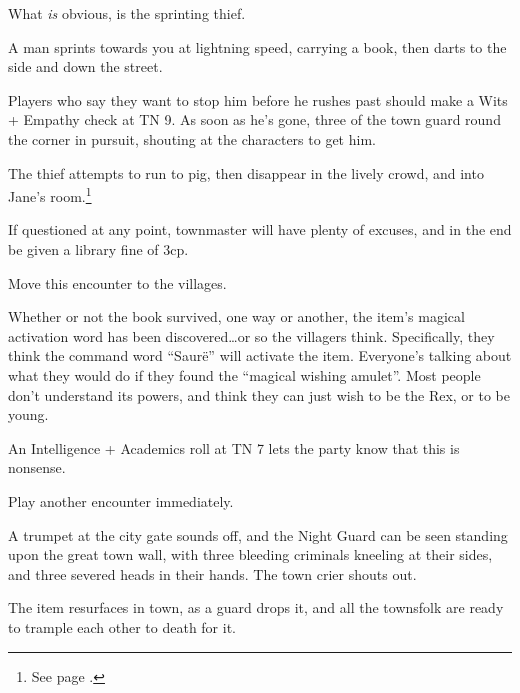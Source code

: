 \begin{multicols}{2}
What \emph{is} obvious, is the sprinting thief.

\begin{boxtext}

	A man sprints towards you at lightning speed, carrying a book, then darts to the side and down the street.

\end{boxtext}

Players who say they want to stop him before he rushes past should make a Wits + Empathy check at TN 9.
As soon as he's gone, three of the town guard round the corner in pursuit, shouting at the characters to get him.

The thief attempts to run to \gls{pig}, then disappear in the lively crowd, and into Jane's room.\footnote{See page \pageref{priestessjane}.}


If questioned at any point, \gls{townmaster} will have plenty of excuses, and in the end be given a library fine of 3cp.

Move this encounter to the villages.


Whether or not the book survived, one way or another, the item's magical activation word has been discovered\ldots or so the villagers think.
Specifically, they think the command word ``Saur\"{e}'' will activate the item.
Everyone's talking about what they would do if they found the ``magical wishing amulet''.
Most people don't understand its powers, and think they can just wish to be the Rex, or to be young.

An Intelligence + Academics roll at TN 7 lets the party know that this is nonsense.

Play another encounter immediately.


\begin{boxtext}

	A trumpet at the city gate sounds off, and the Night Guard can be seen standing upon the great town wall, with three bleeding criminals kneeling at their sides, and three severed heads in their hands.  The town crier shouts out.

\end{boxtext}

The item resurfaces in town, as a guard drops it, and all the townsfolk are ready to trample each other to death for it.


\end{multicols}
